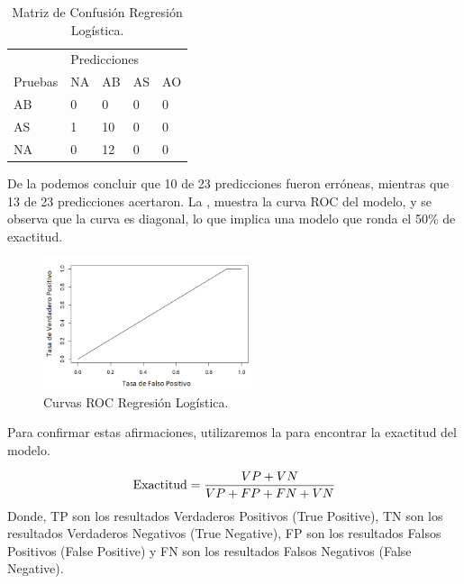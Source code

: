 \documentclass[spanish]{textolivre}
\begin{document}
\begin{table}[htpb]
\centering
\caption{Matriz de Confusión Regresión Logística.}
\label{tab3}
\begin{tabular}{lllll}
\toprule 
 & \multicolumn{4}{l}{Predicciones}   \\ 
\cmidrule{2-5}
Pruebas        & NA      & AB       & AS       & AO
\\ 
\midrule
AB             & 0       & 0        & 0        & 0
\\ 
AS             & 1       & 10       & 0        & 0
\\
NA             & 0       & 12       & 0        & 0
\\
\bottomrule
\end{tabular}
\end{table}

De la  podemos concluir que 10 de 23 predicciones fueron erróneas, mientras que 13 de 23 predicciones acertaron. La , muestra la curva ROC del modelo, y se observa que la curva es diagonal, lo que implica una modelo que ronda el 50\% de exactitud.

\begin{figure}[htbp]
 \centering
 \includegraphics[width=0.55\textwidth]{figura8.png}
 \caption{Curvas ROC Regresión Logística.}
 \label{figura8}
\end{figure}

Para confirmar estas afirmaciones, utilizaremos la   
para encontrar la exactitud del modelo.


\begin{equation}\label{eq01}
    \textmd{Exactitud} = \frac{ VP + VN }{VP + FP + FN + VN}
\end{equation}
Donde, 
TP son los resultados Verdaderos Positivos (True Positive),
TN son los resultados Verdaderos Negativos (True Negative),
FP son los resultados Falsos Positivos (False Positive) y 
FN son los resultados Falsos Negativos (False Negative).
\end{document}
